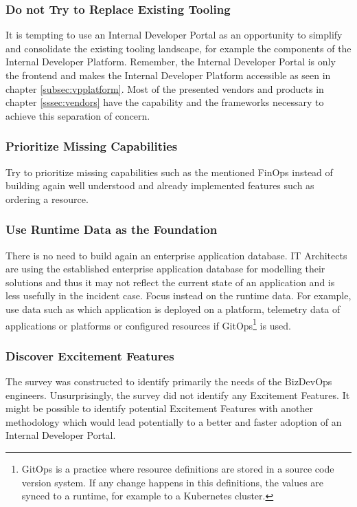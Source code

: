 \documentclass[a4paper,10pt]{article}
\begin{document}
    \subsubsection{Do not Try to Replace Existing Tooling}
    It is tempting to use an Internal Developer Portal as an opportunity to simplify and consolidate the existing tooling
    landscape, for example the components of the Internal Developer Platform.
    Remember, the Internal Developer Portal is only the frontend and makes the Internal Developer Platform accessible
    as seen in chapter \ref{subsec:vpplatform}.
    Most of the presented vendors and products in chapter \ref{sssec:vendors} have the capability and the frameworks
    necessary to achieve this separation of concern.

    \subsubsection{Prioritize Missing Capabilities}
    Try to prioritize missing capabilities such as the mentioned FinOps instead of building again well understood and already
    implemented features such as ordering a resource.

    \subsubsection{Use Runtime Data as the Foundation}
    There is no need to build again an enterprise application database.
    IT Architects are using the established enterprise application database for modelling their solutions and thus it
    may not reflect the current state of an application and is less usefully in the incident case.
    Focus instead on the runtime data.
    For example, use data such as which application is deployed on a platform, telemetry data of applications or platforms or
    configured resources if GitOps\footnote{
        GitOps is a practice where resource definitions are stored in a source code version system. If any change
        happens in this definitions, the values are synced to a runtime, for example to a Kubernetes cluster.} is used.

    \subsubsection{Discover Excitement Features}
    The survey was constructed to identify primarily the needs of the BizDevOps engineers.
    Unsurprisingly, the survey did not identify any Excitement Features.
    It might be possible to identify potential Excitement Features with another methodology which would lead potentially
    to a better and faster adoption of an Internal Developer Portal.
\end{document}
